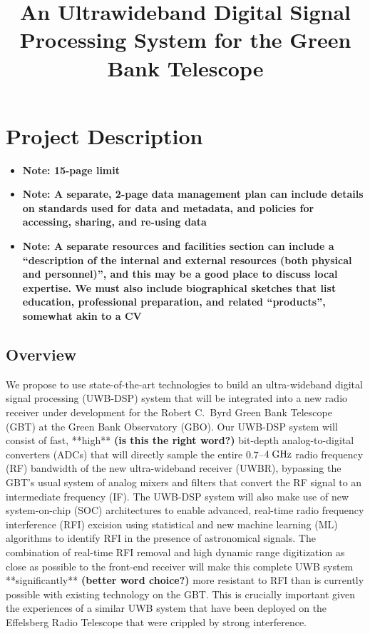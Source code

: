 \documentclass[10pt]{myNSF}
\begin{document}
\title{An Ultrawideband Digital Signal Processing System for the Green
  Bank Telescope}
\maketitle

\section{Project Description}
\label{sec:project_description}

\begin{itemize}
\item{\textbf{Note: 15-page limit}}
\item{\textbf{Note: A separate, 2-page data management plan can
      include details on standards used for data and metadata, and
      policies for accessing, sharing, and re-using data}}
\item{\textbf{Note: A separate resources and facilities section can
      include a ``description of the internal and external resources
      (both physical and personnel)'', and this may be a good place to
      discuss local expertise.  We must also include biographical
      sketches that list education, professional preparation, and
      related ``products'', somewhat akin to a CV}}
\end{itemize}

\subsection{Overview}
\label{sec:overview}

We propose to use state-of-the-art technologies to build an
ultra-wideband digital signal processing (UWB-DSP) system that will be
integrated into a new radio receiver under development for the Robert
C.\ Byrd Green Bank Telescope (GBT) at the Green Bank Observatory
(GBO).  Our UWB-DSP system will consist of fast, **high** \textbf{(is
  this the right word?)} bit-depth analog-to-digital converters (ADCs)
that will directly sample the entire $0.7$--$4\; \textrm{GHz}$ radio frequency
(RF) bandwidth of the new ultra-wideband receiver (UWBR), bypassing the
GBT's usual system of analog mixers and filters that convert the RF
signal to an intermediate frequency (IF).  The UWB-DSP system will
also make use of new system-on-chip (SOC) architectures to enable
advanced, real-time radio frequency interference (RFI) excision using
statistical and new machine learning (ML) algorithms to identify RFI
in the presence of astronomical signals.  The combination of real-time
RFI removal and high dynamic range digitization as close as possible
to the front-end receiver will make this complete UWB system
**significantly** \textbf{(better word choice?)} more resistant to RFI
than is currently possible with existing technology on the GBT.  This
is crucially important given the experiences of a similar UWB system
that have been deployed on the Effelsberg Radio Telescope that were
crippled by strong interference.
\end{document}
